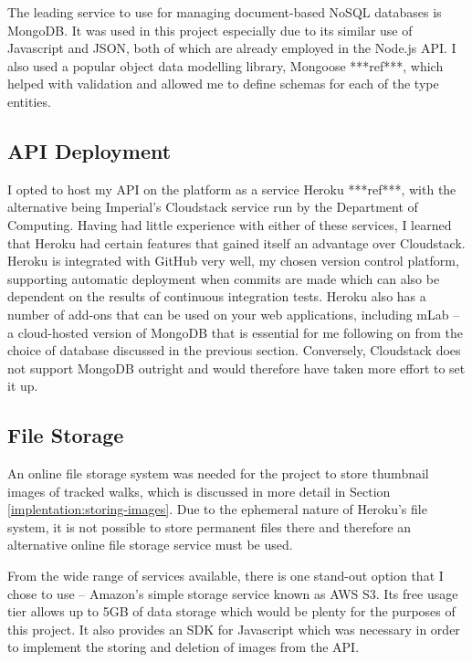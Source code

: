 The leading service to use for managing document-based NoSQL databases is MongoDB. It was used in this project especially due to its similar use of Javascript and JSON, both of which are already employed in the Node.js API. I also used a popular object data modelling library, Mongoose ***ref***, which helped with validation and allowed me to define schemas for each of the type entities.

\subsection{API Deployment}

I opted to host my API on the platform as a service Heroku ***ref***, with the alternative being Imperial's Cloudstack service run by the Department of Computing. Having had little experience with either of these services, I learned that Heroku had certain features that gained itself an advantage over Cloudstack. Heroku is integrated with GitHub very well, my chosen version control platform, supporting automatic deployment when commits are made which can also be dependent on the results of continuous integration tests. Heroku also has a number of add-ons that can be used on your web applications, including mLab -- a cloud-hosted version of MongoDB that is essential for me following on from the choice of database discussed in the previous section. Conversely, Cloudstack does not support MongoDB outright and would therefore have taken more effort to set it up.


\subsection{File Storage}


An online file storage system was needed for the project to store thumbnail images of tracked walks, which is discussed in more detail in Section \ref{implentation:storing-images}. Due to the ephemeral nature of Heroku's file system, it is not possible to store permanent files there and therefore an alternative online file storage service must be used.

From the wide range of services available, there is one stand-out option that I chose to use -- Amazon's simple storage service known as AWS S3. Its free usage tier allows up to 5GB of data storage which would be plenty for the purposes of this project. It also provides an SDK for Javascript which was necessary in order to implement the storing and deletion of images from the API.


